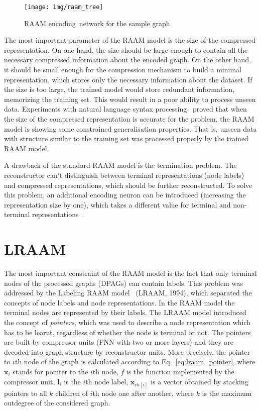 \begin{figure}
\begin{center}
	\texttt{[image: img/raam\_tree]}
	\caption{RAAM encoding~network for the sample graph}
	\label{fig:raam_tree}
\end{center}
\end{figure}

The most important parameter of the RAAM model is the size of the compressed representation. On one hand, the size should be large enough to contain all the necessary compressed information about the encoded graph. On the other hand, it should be small enough for the compression mechanism to build a minimal representation, which stores only the necessary information about the dataset. If the size is too large, the trained model would store redundant information, memorizing the training set. This would result in a poor ability to process unseen data. Experiments with natural language syntax processing~\cite{pollack1990recursive} proved that when the size of the compressed representation is accurate for the problem, the RAAM model is showing some constrained generalisation properties. That is, unseen data with structure similar to the training set was processed properly by the trained RAAM model.

A drawback of the standard RAAM model is the termination problem. The reconstructor can't distinguish between terminal representations (node labels) and compressed representations, which should be further reconstructed. To solve this problem, an additional encoding neuron can be introduced (increasing the representation size by one), which takes a different value for terminal and non-terminal representations~\cite{stolcke1992tree}.

\section{LRAAM}
The most important constraint of the RAAM model is the fact that only terminal nodes of the processed graphs (DPAGs) can contain labels. This problem was addressed by the Labeling RAAM model~\cite{sperduti1994labelling} (LRAAM, 1994), which separated the concepts of node labels and node representations. In the RAAM model the terminal nodes are represented by their labels. The LRAAM model introduced the concept of \emph{pointers}, which was used to describe a node representation which has to be learnt, regardless of whether the node is terminal or not. The pointers are built by compressor units (FNN with two or more layers) and they are decoded into graph structure by reconstructor units. More precisely, the pointer to $i$th node of the graph is calculated according to Eq.~\ref{eq:lraam_pointer}, where $\bm{x}_i$ stands for pointer to the $i$th node, $f$ is the function implemented by the compressor unit, $\bm{l}_i$ is the $i$th node label, $\bm{x}_{ch[i]}$ is a vector obtained by stacking pointers to all $k$ children of $i$th node one after another, where $k$ is the maximum outdegree of the considered graph.

